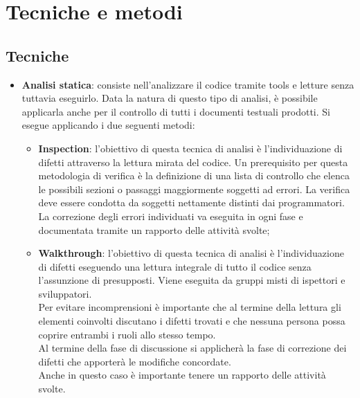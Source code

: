 \section{Tecniche e metodi}{
\subsection {Tecniche}{
	\begin{itemize}
		\item \textbf{Analisi statica}: consiste nell’analizzare il codice tramite tools e letture senza tuttavia eseguirlo. Data la natura di questo tipo di analisi, è possibile applicarla anche per il controllo di tutti i documenti testuali prodotti.
		Si esegue applicando i due seguenti metodi:
		\begin{itemize}
			\item \textbf{Inspection}: l’obiettivo di questa tecnica di analisi è l’individuazione di difetti attraverso la lettura mirata del codice. Un prerequisito per questa metodologia di verifica è la definizione di una lista di controllo che elenca le possibili sezioni o passaggi maggiormente soggetti ad errori. La verifica deve essere condotta da soggetti nettamente distinti dai programmatori. La correzione degli errori individuati va eseguita in ogni fase e documentata tramite un rapporto delle attività svolte;
			
			\item \textbf{Walkthrough}: l'obiettivo di questa tecnica di analisi è l'individuazione di difetti eseguendo una lettura integrale di tutto il codice senza l'assunzione di presupposti. Viene eseguita da gruppi misti di ispettori e sviluppatori. \\
			Per evitare incomprensioni è importante che al termine della lettura gli elementi coinvolti discutano i difetti trovati e che nessuna persona possa coprire entrambi i ruoli allo stesso tempo. \\
			Al termine della fase di discussione si applicherà la fase di correzione dei difetti che apporterà le modifiche concordate.  \\
			Anche in questo caso è importante tenere un rapporto delle attività svolte.
		\end{itemize}
		

\end{itemize}}}
